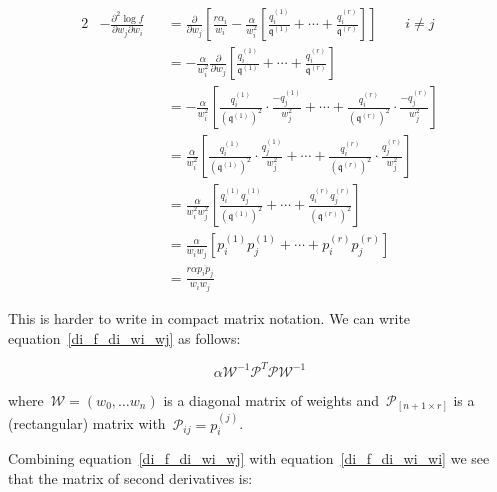 \documentclass[nojss]{jss}
\begin{document}
\begin{alignat}{2}
& -\frac{\partial^2\log f}{\partial w_j\partial w_i}&&=
  \frac{\partial}{\partial w_j}\left[
    \frac{r\alpha_i}{w_i} - \frac{\alpha}{w_i^2}\left[
  \frac{q_i^{(1)}}{\mathfrak{q}^{(1)}}
    +\cdots+
      \frac{q_i^{(r)}}{\mathfrak{q}^{(r)}}\right]\right]\qquad i\neq j  \\
  & &&=-\frac{\alpha}{w_i^2}\frac{\partial}{\partial w_j}\left[
      \frac{q_i^{(1)}}{\mathfrak{q}^{(1)}}
    +\cdots+
      \frac{q_i^{(r)}}{\mathfrak{q}^{(r)}}\right]\\
  & &&=-\frac{\alpha}{w_i^2}\left[
          \frac{q_i^{(1)}}{\left(\mathfrak{q}^{(1)}\right)^{2}}\cdot\frac{-q_j^{(1)}}{w_j^2}
          +\cdots+
          \frac{q_i^{(r)}}{\left(\mathfrak{q}^{(r)}\right)^{2}}\cdot\frac{-q_j^{(r)}}{w_j^2}
          \right]\\
    & &&=\frac{\alpha}{w_i^2}\left[
          \frac{q_i^{(1)}}{\left(\mathfrak{q}^{(1)}\right)^{2}}\cdot\frac{q_j^{(1)}}{w_j^2}
          +\cdots+
          \frac{q_i^{(r)}}{\left(\mathfrak{q}^{(r)}\right)^{2}}\cdot\frac{q_j^{(r)}}{w_j^2}
          \right]\\
      & &&= \frac{\alpha}{w_i^2w_j^2}\left[
          \frac{q_i^{(1)}q_j^{(1)}}{\left(\mathfrak{q}^{(1)}\right)^{2}}
          +\cdots+
          \frac{q_i^{(r)}q_j^{(r)}}{\left(\mathfrak{q}^{(r)}\right)^{2}}
          \right]\\
  & &&= \frac{\alpha}{w_iw_j}\left[p_i^{(1)}p_j^{(1)} +\cdots+p_i^{(r)}p_j^{(r)}\right]\\
  & &&= \frac{r\alpha\overline{p_ip_j}}{w_iw_j}\label{di_f_di_wi_wj}
\end{alignat}

This is harder to write in compact matrix notation.  We can write
equation~\ref{di_f_di_wi_wj} as follows:

\begin{equation}
\alpha\mathcal{W}^{-1}\mathcal{P}^T\mathcal{P}\mathcal{W}^{-1}
\end{equation}

where~$\mathcal{W}=\left(w_0,\ldots w_n\right)$ is a diagonal matrix
of weights and~$\mathcal{P}_{[n+1\times r]}$ is a (rectangular) matrix
with~$\mathcal{P}_{ij}=p_i^{(j)}$.

Combining equation~\ref{di_f_di_wi_wj} with
equation~\ref{di_f_di_wi_wi} we see that the matrix of second
derivatives is:
\end{document}
